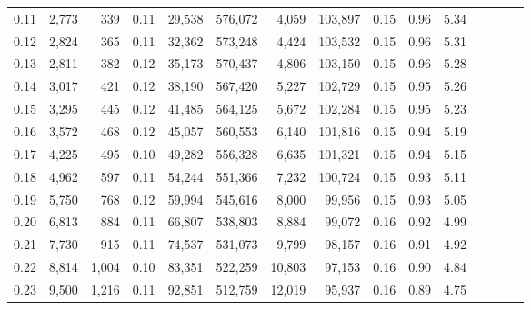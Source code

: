 \begin{tabular}{rrrcrrrrrrrrrrr}
0.11 &   2,773 &     339 &                                       0.11 &   29,538 &  576,072 &    4,059 &  103,897 &  0.15 &  0.96 &                         5.34 \\
0.12 &   2,824 &     365 &                                       0.11 &   32,362 &  573,248 &    4,424 &  103,532 &  0.15 &  0.96 &                         5.31 \\
0.13 &   2,811 &     382 &                                       0.12 &   35,173 &  570,437 &    4,806 &  103,150 &  0.15 &  0.96 &                         5.28 \\
0.14 &   3,017 &     421 &                                       0.12 &   38,190 &  567,420 &    5,227 &  102,729 &  0.15 &  0.95 &                         5.26 \\
0.15 &   3,295 &     445 &                                       0.12 &   41,485 &  564,125 &    5,672 &  102,284 &  0.15 &  0.95 &                         5.23 \\
0.16 &   3,572 &     468 &                                       0.12 &   45,057 &  560,553 &    6,140 &  101,816 &  0.15 &  0.94 &                         5.19 \\
0.17 &   4,225 &     495 &                                       0.10 &   49,282 &  556,328 &    6,635 &  101,321 &  0.15 &  0.94 &                         5.15 \\
0.18 &   4,962 &     597 &                                       0.11 &   54,244 &  551,366 &    7,232 &  100,724 &  0.15 &  0.93 &                         5.11 \\
0.19 &   5,750 &     768 &                                       0.12 &   59,994 &  545,616 &    8,000 &   99,956 &  0.15 &  0.93 &                         5.05 \\
0.20 &   6,813 &     884 &                                       0.11 &   66,807 &  538,803 &    8,884 &   99,072 &  0.16 &  0.92 &                         4.99 \\
0.21 &   7,730 &     915 &                                       0.11 &   74,537 &  531,073 &    9,799 &   98,157 &  0.16 &  0.91 &                         4.92 \\
0.22 &   8,814 &   1,004 &                                       0.10 &   83,351 &  522,259 &   10,803 &   97,153 &  0.16 &  0.90 &                         4.84 \\
0.23 &   9,500 &   1,216 &                                       0.11 &   92,851 &  512,759 &   12,019 &   95,937 &  0.16 &  0.89 &                         4.75 \\

\end{tabular}

